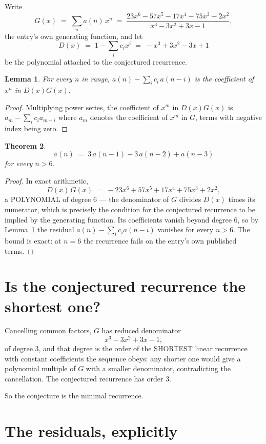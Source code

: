 \documentclass[11pt,a4paper]{article}
\theoremstyle{plain}
\newtheorem{theorem}{Theorem}
\newtheorem{lemma}[theorem]{Lemma}
\theoremstyle{definition}
\begin{document}
Write
\[
G(x)\;=\;\sum_{n}a(n)\,x^{n}\;=\;\frac{23 x^{6} - 57 x^{5} - 17 x^{4} - 75 x^{3} - 2 x^{2}}{x^{3} - 3 x^{2} + 3 x - 1},
\]
the entry's own generating function, and let
\[
D(x)\;=\;1-\sum_i c_i x^{i}\;=\;- x^{3} + 3 x^{2} - 3 x + 1
\]
be the polynomial attached to the conjectured recurrence.

\begin{lemma}\label{lem:key}
For every $n$ in range, $a(n)-\sum_i c_i\,a(n-i)$ is the coefficient of $x^{n}$ in
$D(x)G(x)$.
\end{lemma}

\begin{proof}
Multiplying power series, the coefficient of $x^{m}$ in $D(x)G(x)$ is
$a_m-\sum_i c_i a_{m-i}$ where $a_m$ denotes the coefficient of $x^{m}$ in $G$, terms with
negative index being zero.
\end{proof}

\begin{theorem}
\[
a(n)\;=\;3\,a(n-1) - 3\,a(n-2) + a(n-3)
\]
for every $n>6$.
\end{theorem}

\begin{proof}
In exact arithmetic,
\[
D(x)\,G(x)\;=\;- 23 x^{6} + 57 x^{5} + 17 x^{4} + 75 x^{3} + 2 x^{2},
\]
a POLYNOMIAL of degree $6$ --- the denominator of $G$ divides $D(x)$ times its numerator,
which is precisely the condition for the conjectured recurrence to be implied by the
generating function. Its coefficients vanish beyond degree $6$, so by
Lemma~\ref{lem:key} the residual $a(n)-\sum_ic_ia(n-i)$ vanishes for every
$n>6$. The bound is exact: at $n=6$ the recurrence fails on the entry's own published terms.
\end{proof}

\section{Is the conjectured recurrence the shortest one?}

Cancelling common factors, $G$ has reduced denominator
\[
x^{3} - 3 x^{2} + 3 x - 1,
\]
of degree $3$, and that degree is the order of the SHORTEST linear recurrence with
constant coefficients the sequence obeys: any shorter one would give a polynomial multiple of
$G$ with a smaller denominator, contradicting the cancellation. The conjectured recurrence has
order $3$.

So the conjecture is the minimal recurrence.

\section{The residuals, explicitly}
\end{document}
